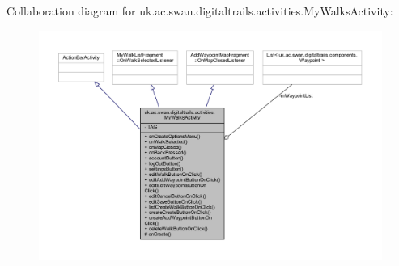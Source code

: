 Collaboration diagram for uk.\+ac.\+swan.\+digitaltrails.\+activities.\+My\+Walks\+Activity\+:
\nopagebreak
\begin{figure}[H]
\begin{center}
\leavevmode
\includegraphics[width=350pt]{classuk_1_1ac_1_1swan_1_1digitaltrails_1_1activities_1_1_my_walks_activity__coll__graph}
\end{center}
\end{figure}
